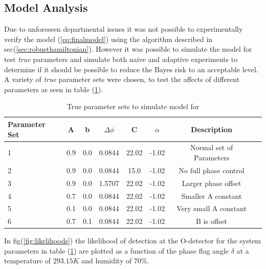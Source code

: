 \subsection{Model Analysis}
Due to unforeseen departmental issues it was not possible to experimentally verify the model (\ref{eq:finalmodel}) using the algorithm described in sec(\ref{sec:robusthamiltonian}). However it was possible to simulate the model for test \textit{true} parameters and simulate both naive and adaptive experiments to determine if it should be possible to reduce the Bayes risk to an acceptable level. A variety of \textit{true} parameter sets were chosen, to test the affects of different parameters as seen in table (\ref{tab:trueparams}). 
\begin{table}[h]
\begin{center}
\begin{tabular}{l*{6}{c}r}
Parameter Set     & A&b& $\Delta\phi$ & C & $\alpha$ & Description \\
\hline
1& 0.9& 0.0& 0.0844& 22.02& -1.02 & Normal set of Parameters  \\
2&  0.9& 0.0& 0.0844& 15.0& -1.02 & No full phase control \\
3& 0.9& 0.0& 1.5707& 22.02& -1.02 &   Larger phase offset \\
4& 0.7& 0.0& 0.0844& 22.02& -1.02 & Smaller A constant\\
5& 0.1& 0.0& 0.0844& 22.02& -1.02 & Very small A constant\\
6&  0.7& 0.1& 0.0844& 22.02& -1.02 & B is offset\\
\end{tabular}
\caption{True parameter sets to simulate model for}
\label{tab:trueparams}
\end{center}
\end{table}
In fig(\ref{fig:likelihoods}) the likelihood of detection at the O-detector for the system parameters in table (\ref{tab:trueparams}) are plotted as a function of the phase flag angle $\delta$ at a temperature of $293.15K$ and humidity of $70\%$. 

